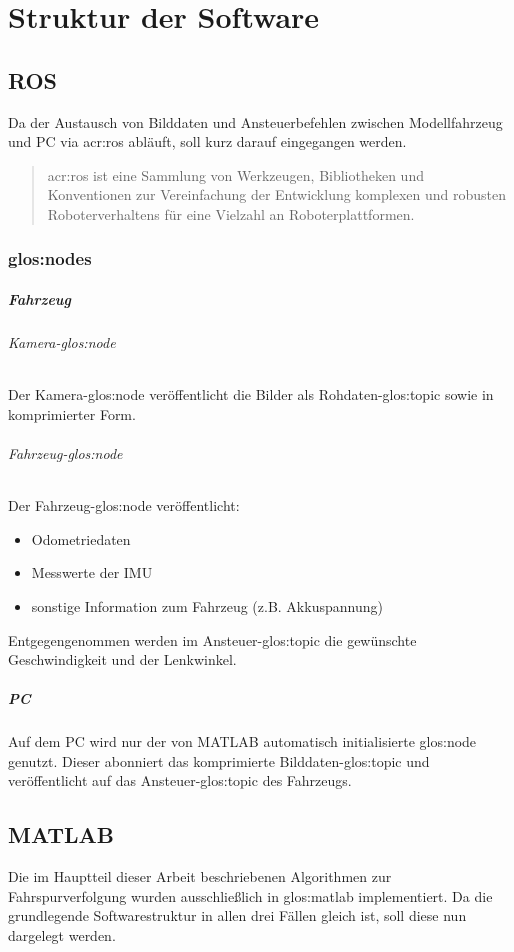 \chapter{Struktur der Software}

\section{ROS}
Da der Austausch von Bilddaten und Ansteuerbefehlen zwischen Modellfahrzeug und PC via \gls{acr:ros} \autocite{ROSOrgPowering} abläuft, soll kurz darauf eingegangen werden. 
\begin{quotation}
\gls{acr:ros} ist eine Sammlung von Werkzeugen, Bibliotheken und Konventionen zur Vereinfachung der Entwicklung komplexen und robusten Roboterverhaltens für eine Vielzahl an Roboterplattformen. \autocite{ROSOrgROS}
\end{quotation}

\subsection{\glspl{glos:node}}
\paragraph{Fahrzeug}
\subparagraph{Kamera-\gls{glos:node}}
Der Kamera-\gls{glos:node} veröffentlicht die Bilder als Rohdaten-\gls{glos:topic} sowie in komprimierter Form.
\subparagraph{Fahrzeug-\gls{glos:node}}
Der Fahrzeug-\gls{glos:node} veröffentlicht:
\begin{itemize}
\item Odometriedaten 
\item Messwerte der IMU
\item sonstige Information zum Fahrzeug (z.B. Akkuspannung)
\end{itemize}
Entgegengenommen werden im Ansteuer-\gls{glos:topic} die gewünschte Geschwindigkeit und der Lenkwinkel.
\paragraph{PC}
Auf dem PC wird nur der von MATLAB automatisch initialisierte \gls{glos:node} genutzt. Dieser abonniert das komprimierte Bilddaten-\gls{glos:topic} und veröffentlicht auf das Ansteuer-\gls{glos:topic} des Fahrzeugs.

\section{MATLAB}
Die im Hauptteil dieser Arbeit beschriebenen Algorithmen zur Fahrspurverfolgung wurden ausschließlich in \gls{glos:matlab} implementiert. Da die grundlegende Softwarestruktur in allen drei Fällen gleich ist, soll diese nun dargelegt werden.

